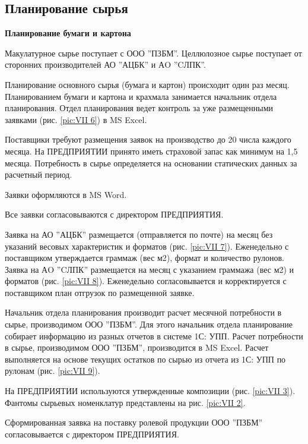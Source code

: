 \newpage
\subsection{Планирование сырья}
\label{bp:RawMaterialPlanning}

\textbf{Планирование бумаги и картона}

Макулатурное сырье поступает с ООО ''ПЗБМ''. Целлюлозное сырье поступает от сторонних производителей АО ''АЦБК'' и  АO ''CЛПК''.

Планирование основного сырья (бумага и картон) происходит один раз месяц.
Планированием бумаги и картона и крахмала занимается начальник отдела планирования. 
Отдел планирования ведет контроль за уже размещенными заявками (рис. \ref{pic:VII 6}) в MS Excel.

Поставщики требуют размещения заявок на производство до 20 числа каждого месяца. На ПРЕДПРИЯТИИ принято иметь страховой запас как минимум на 1,5 месяца. Потребность в сырье определяется на основании статических данных за расчетный период. 

Заявки оформляются в MS Word. 

Все заявки согласовываются с директором ПРЕДПРИЯТИЯ.

Заявка на АО ''АЦБК'' размещается (отправляется по почте) на месяц без указаний весовых характеристик и форматов (рис. \ref{pic:VII 7}).  Еженедельно с поставщиком утверждается граммаж (вес м2), формат и количество рулонов.
Заявка на АO ''CЛПК'' размещается на месяц с указанием граммажа (вес м2)  и форматов (рис. \ref{pic:VII 8}). Еженедельно согласовывается и корректируется с поставщиком план отгрузок по размещенной заявке.

Начальник отдела планирования производит расчет месячной потребности в сырье, производимом ООО ''ПЗБМ''. Для этого начальник отдела планирование собирает информацию из разных отчетов в системе 1С: УПП.
Расчет потребности в сырье, производимом ООО ''ПЗБМ'', производится в MS Excel.
Расчет выполняется на основе текущих остатков по сырью из отчета из 1С: УПП по рулонам (рис. \ref{pic:VII 9}).

На ПРЕДПРИЯТИИ используются утвержденные композиции (рис. \ref{pic:VII 3}). Фантомы сырьевых номенклатур представлены на рис. \ref{pic:VII 2}.

Сформированная заявка на поставку ролевой продукции ООО ''ПЗБМ'' согласовывается с директором ПРЕДПРИЯТИЯ.


 \clearpage
 
